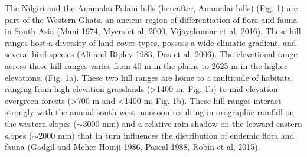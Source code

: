 The Nilgiri and the Anamalai-Palani hills (hereafter, Anamalai hills) (Fig.
1) are part of the Western Ghats, an ancient region of differentiation of flora and fauna in South Asia (Mani 1974, Myers et al, 2000, Vijayakumar et al, 2016).
These hill ranges host a diversity of land cover types, possess a wide climatic gradient, and several bird species (Ali and Ripley 1983, Das et al, 2006).
The elevational range across these hill ranges varies from 40 m in the plains to 2625 m in the higher elevations.
(Fig.
1a).
These two hill ranges are home to a multitude of habitats, ranging from high elevation grasslands (>1400 m; Fig.
1b) to mid-elevation evergreen forests (>700 m and <1400 m; Fig.
1b).
These hill ranges interact strongly with the annual south-west monsoon resulting in orographic rainfall on the western slopes ($\sim$3000 mm) and a relative rain-shadow on the leeward eastern slopes ($\sim$2000 mm) that in turn influences the distribution of endemic flora and fauna (Gadgil and Meher-Homji 1986, Pascal 1988, Robin et al, 2015).

